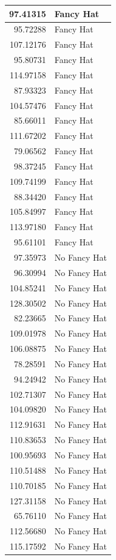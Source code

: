 \documentclass[]{tufte-handout}
\begin{document}
\begin{table}
\begin{tabular}[t]{r|l}
97.41315 & Fancy Hat\\
\hline
95.72288 & Fancy Hat\\
\hline
107.12176 & Fancy Hat\\
\hline
95.80731 & Fancy Hat\\
\hline
114.97158 & Fancy Hat\\
\hline
87.93323 & Fancy Hat\\
\hline
104.57476 & Fancy Hat\\
\hline
85.66011 & Fancy Hat\\
\hline
111.67202 & Fancy Hat\\
\hline
79.06562 & Fancy Hat\\
\hline
98.37245 & Fancy Hat\\
\hline
109.74199 & Fancy Hat\\
\hline
88.34420 & Fancy Hat\\
\hline
105.84997 & Fancy Hat\\
\hline
113.97180 & Fancy Hat\\
\hline
95.61101 & Fancy Hat\\
\hline
97.35973 & No Fancy Hat\\
\hline
96.30994 & No Fancy Hat\\
\hline
104.85241 & No Fancy Hat\\
\hline
128.30502 & No Fancy Hat\\
\hline
82.23665 & No Fancy Hat\\
\hline
109.01978 & No Fancy Hat\\
\hline
106.08875 & No Fancy Hat\\
\hline
78.28591 & No Fancy Hat\\
\hline
94.24942 & No Fancy Hat\\
\hline
102.71307 & No Fancy Hat\\
\hline
104.09820 & No Fancy Hat\\
\hline
112.91631 & No Fancy Hat\\
\hline
110.83653 & No Fancy Hat\\
\hline
100.95693 & No Fancy Hat\\
\hline
110.51488 & No Fancy Hat\\
\hline
110.70185 & No Fancy Hat\\
\hline
127.31158 & No Fancy Hat\\
\hline
65.76110 & No Fancy Hat\\
\hline
112.56680 & No Fancy Hat\\
\hline
115.17592 & No Fancy Hat\\
\hline

\end{tabular}
\end{table}
\end{document}
